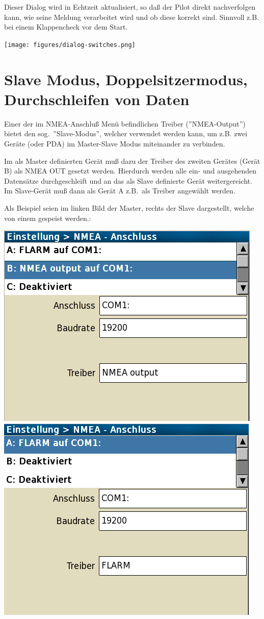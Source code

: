Dieser Dialog wird in Echtzeit aktualisiert, so daß der Pilot direkt nachverfolgen kann, wie seine Meldung verarbeitet wird und ob diese korrekt sind. 
Sinnvoll z.B. bei einem Klappencheck vor dem Start.


\begin{center}
\texttt{[image: figures/dialog-switches.png]}
\end{center}
\section{Slave Modus, Doppelsitzermodus, Durchschleifen von Daten}

Einer der im NMEA-Anschluß Menü befindlichen Treiber (''NMEA-Output'') bietet den sog.\  ''Slave-Modus'', welcher verwendet werden kann,  um z.B. zwei Geräte  (\al oder \textsf{PDA})  im Master-Slave Modus miteinander zu verbinden. 

Im als Master definierten Gerät muß dazu der Treiber des zweiten  Gerätes (Gerät B) als NMEA OUT gesetzt werden.
Hierdurch werden alle ein- und ausgehenden Datensätze  durchgeschleift und an das als Slave definierte Gerät weitergereicht.
Im Slave-Gerät muß dann als Gerät A z.B.\ \fl als Treiber angewählt werden.

Als Beispiel seien im linken Bild der Master, rechts der Slave dargestellt, welche von einem \fl gespeist werden.:


\begin{center}%
\includegraphics[angle=0,width=0.45\linewidth,keepaspectratio='true']{figures/config-nmea-ms-master.png}\quad
\includegraphics[angle=0,width=0.45\linewidth,keepaspectratio='true']{figures/config-nmea-ms-slave.png}
\end{center}

